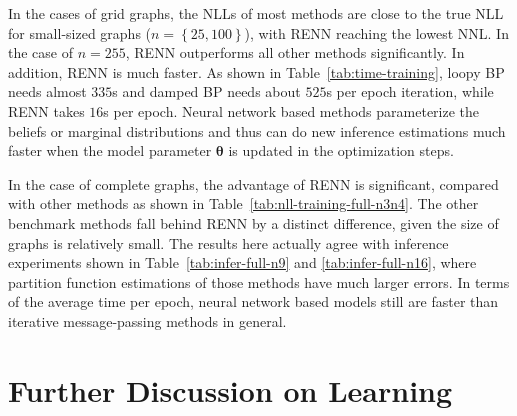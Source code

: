 In the cases of grid graphs, the NLLs of most methods are close to the true NLL for small-sized graphs ($n=\left\{ 25, 100 \right\}$), with RENN reaching the lowest NNL. In the case of $n=255$, RENN outperforms all other methods significantly. In addition, RENN is much faster. As shown in Table~\ref{tab:time-training}, loopy BP needs almost $335$s and damped BP needs about $525$s per epoch iteration, while RENN takes $16$s per epoch.
Neural network based methods parameterize the beliefs or marginal distributions and thus can do new inference estimations much faster when the model parameter $\bm{\theta}$ is updated in the optimization steps. 



In the case of complete graphs, the advantage of RENN is significant, compared with other methods as shown in Table~\ref{tab:nll-training-full-n3n4}. The other benchmark methods fall behind RENN by a distinct difference, given the size of graphs is relatively small. The results here actually agree with inference experiments shown in Table~\ref{tab:infer-full-n9} and \ref{tab:infer-full-n16}, where partition function estimations of those methods have much larger errors. In terms of the average time per epoch, neural network based models still are faster than iterative message-passing methods in general.


\section{Further Discussion on Learning}\label{chpt5:sec:futher-dis-learning}

